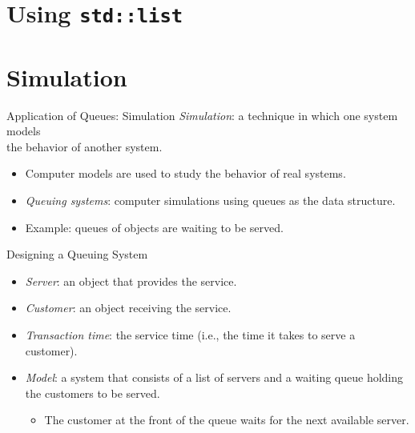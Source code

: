 \documentclass[14pt,aspectratio=1610]{beamer}
\begin{document}
\section{Using \texttt{std::list}}

\section{Simulation}

\begin{frame}{Application of Queues: Simulation}
  \emph{Simulation}: a technique in which one system models\\ the behavior of another system.

  \begin{itemize}
  \item
    Computer models are used to study the behavior of real systems.
  \item
    \emph{Queuing systems}: computer simulations using queues as the data structure.
  \item
    Example: queues of objects are waiting to be served.
\end{itemize}
\end{frame}

\begin{frame}{Designing a Queuing System}
  
  \begin{itemize}
    \item 
      \emph{Server}: an object that provides the service.

    \item
      \emph{Customer}: an object receiving the service.

    \item
      \emph{Transaction time}: the service time (i.e., the time it takes to serve a customer).
    \item
      \emph{Model}: a system that consists of a list of servers and a waiting queue holding the customers to be served.
      \begin{itemize}
        \item
          The customer at the front of the queue waits for the next available server.
      \end{itemize}
\end{itemize}
\end{frame}
\end{document}
